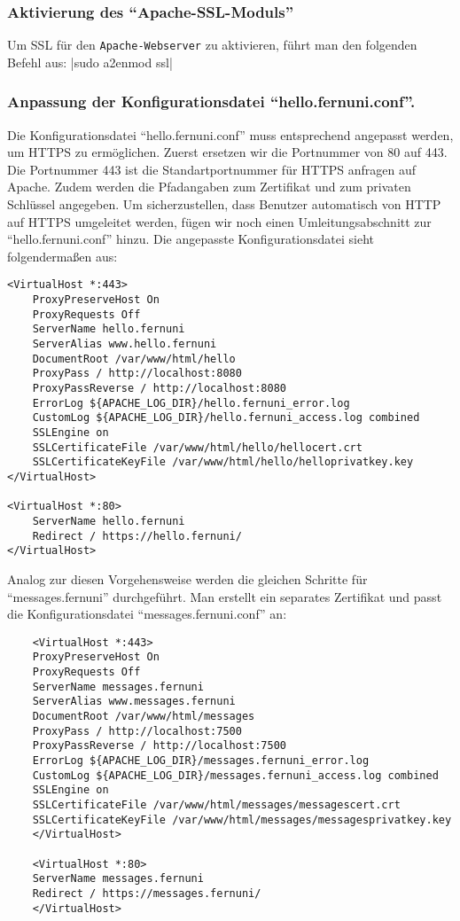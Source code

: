 \subsubsection*{Aktivierung des \enquote{Apache-SSL-Moduls}}

Um SSL für den \verb+Apache-Webserver+ zu aktivieren, führt man den folgenden Befehl aus:
|sudo a2enmod ssl|

\subsubsection*{Anpassung der Konfigurationsdatei \enquote{hello.fernuni.conf}.}

Die Konfigurationsdatei \enquote{hello.fernuni.conf} muss entsprechend angepasst werden, um HTTPS zu ermöglichen. Zuerst ersetzen wir die Portnummer von 80 auf 443. Die Portnummer 443 ist die Standartportnummer für HTTPS anfragen auf Apache. Zudem werden die Pfadangaben zum Zertifikat und zum privaten Schlüssel angegeben.
Um sicherzustellen, dass Benutzer automatisch von HTTP auf HTTPS umgeleitet werden, fügen wir noch einen Umleitungsabschnitt zur \enquote{hello.fernuni.conf} hinzu. Die angepasste Konfigurationsdatei sieht folgendermaßen aus:
\begin{verbatim}
<VirtualHost *:443>
    ProxyPreserveHost On
    ProxyRequests Off
    ServerName hello.fernuni
    ServerAlias www.hello.fernuni
    DocumentRoot /var/www/html/hello
    ProxyPass / http://localhost:8080
    ProxyPassReverse / http://localhost:8080
    ErrorLog ${APACHE_LOG_DIR}/hello.fernuni_error.log
    CustomLog ${APACHE_LOG_DIR}/hello.fernuni_access.log combined
    SSLEngine on
    SSLCertificateFile /var/www/html/hello/hellocert.crt
    SSLCertificateKeyFile /var/www/html/hello/helloprivatkey.key
</VirtualHost>

<VirtualHost *:80>
    ServerName hello.fernuni
    Redirect / https://hello.fernuni/
</VirtualHost>
\end{verbatim}

Analog zur diesen Vorgehensweise werden die gleichen Schritte für \enquote{messages.fernuni} durchgeführt. Man erstellt ein separates Zertifikat und passt die Konfigurationsdatei \enquote{messages.fernuni.conf} an:

\begin{verbatim}
    <VirtualHost *:443>
    ProxyPreserveHost On
    ProxyRequests Off
    ServerName messages.fernuni
    ServerAlias www.messages.fernuni
    DocumentRoot /var/www/html/messages
    ProxyPass / http://localhost:7500
    ProxyPassReverse / http://localhost:7500
    ErrorLog ${APACHE_LOG_DIR}/messages.fernuni_error.log
    CustomLog ${APACHE_LOG_DIR}/messages.fernuni_access.log combined
    SSLEngine on
    SSLCertificateFile /var/www/html/messages/messagescert.crt
    SSLCertificateKeyFile /var/www/html/messages/messagesprivatkey.key
    </VirtualHost>
    
    <VirtualHost *:80>
    ServerName messages.fernuni
    Redirect / https://messages.fernuni/
    </VirtualHost>
\end{verbatim}

